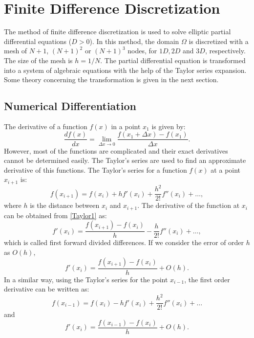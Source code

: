 \documentclass[a4paper,10pt]{report}
\begin{document}
\section{Finite Difference Discretization}
The method of finite difference discretization is used to solve elliptic partial differential
 equations ($D>0$). In this method, the domain $\Omega$ is discretized with a mesh of $N+1$, $(N+1)^2$ or $(N+1)^3$ nodes, for
 $1D,2D$ and $3D$, respectively. The size of the mesh is $h=1/N$. The partial differential equation is transformed into 
 a system of algebraic equations with the help of the Taylor series expansion. Some theory concerning the transformation is given in the next section.
\subsection{Numerical Differentiation} 
The derivative of a function $f(x)$ in a point $x_1$ is given by:
\begin{equation*}
 \frac{df(x)}{dx}=\lim_{\Delta x\rightarrow 0} \frac{f(x_1+\Delta x) -f(x_1)}{\Delta x}.
\end{equation*}
However, most of the functions are complicated and their exact derivatives cannot be determined easily.
The Taylor's series are used to find an approximate derivative of this functions. The Taylor's series for a function $f(x)$ at a point $x_{i+1}$ is:
\begin{equation}
 f(x_{i+1})=f(x_i)+hf'(x_i)+\frac{h^2}{2!}f''(x_i)+\dots, \label{Taylor1}
\end{equation}
where $h$ is the distance between $x_i$ and $x_{i+1}$. The derivative of the function at $x_i$ can be obtained from \eqref{Taylor1} as:
\begin{equation*}
 f'(x_i)=\frac{f(x_{i+1})-f(x_i)}{h}-\frac{h}{2!}f''(x_i)+\dots,
\end{equation*}
which is called first forward divided differences. If we consider the error of order $h$ as $O(h)$,
\begin{equation*}
 f'(x_i)=\frac{f(x_{i+1})-f(x_i)}{h}+O(h). 
\end{equation*}
 In a similar way, using the Taylor's series for the point $x_{i-1}$, the first order derivative can be written as:
 \begin{equation}
 f(x_{i-1})=f(x_i)-hf'(x_i)+\frac{h^2}{2!}f''(x_i)+\dots \label{Taylor2}
\end{equation}
and 
\begin{equation*}
 f'(x_i)=\frac{f(x_{i-1})-f(x_i)}{h}+O(h). 
\end{equation*}
\end{document}
